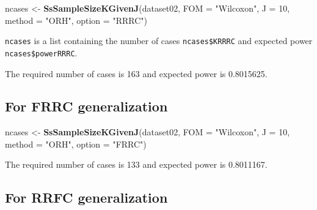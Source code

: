 \documentclass[
]{book}
\newenvironment{Shaded}{\begin{snugshade}}{\end{snugshade}}
\newcommand{\CommentTok}[1]{\textcolor[rgb]{0.56,0.35,0.01}{\textit{#1}}}
\newcommand{\DataTypeTok}[1]{\textcolor[rgb]{0.13,0.29,0.53}{#1}}
\newcommand{\DecValTok}[1]{\textcolor[rgb]{0.00,0.00,0.81}{#1}}
\newcommand{\KeywordTok}[1]{\textcolor[rgb]{0.13,0.29,0.53}{\textbf{#1}}}
\newcommand{\NormalTok}[1]{#1}
\newcommand{\StringTok}[1]{\textcolor[rgb]{0.31,0.60,0.02}{#1}}
\begin{document}
\begin{Shaded}
\begin{Highlighting}[]
\NormalTok{ncases \textless{}{-}}\StringTok{ }\KeywordTok{SsSampleSizeKGivenJ}\NormalTok{(dataset02, }\DataTypeTok{FOM =} \StringTok{"Wilcoxon"}\NormalTok{, }\DataTypeTok{J =} \DecValTok{10}\NormalTok{, }\DataTypeTok{method =} \StringTok{"ORH"}\NormalTok{, }\DataTypeTok{option =} \StringTok{"RRRC"}\NormalTok{)}
\end{Highlighting}
\end{Shaded}

\texttt{ncases} is a list containing the number of cases \texttt{ncases\$KRRRC} and expected power \texttt{ncases\$powerRRRC}.

\begin{Shaded}
\end{Shaded}

The required number of cases is 163 and expected power is 0.8015625.

\hypertarget{for-frrc-generalization}{%
\subsection{For FRRC generalization}\label{for-frrc-generalization}}

\begin{Shaded}
\begin{Highlighting}[]
\NormalTok{ncases \textless{}{-}}\StringTok{ }\KeywordTok{SsSampleSizeKGivenJ}\NormalTok{(dataset02, }\DataTypeTok{FOM =} \StringTok{"Wilcoxon"}\NormalTok{, }\DataTypeTok{J =} \DecValTok{10}\NormalTok{, }\DataTypeTok{method =} \StringTok{"ORH"}\NormalTok{, }\DataTypeTok{option =} \StringTok{"FRRC"}\NormalTok{)}
\end{Highlighting}
\end{Shaded}

The required number of cases is 133 and expected power is 0.8011167.

\hypertarget{for-rrfc-generalization}{%
\subsection{For RRFC generalization}\label{for-rrfc-generalization}}
\end{document}
